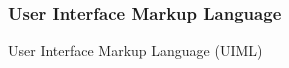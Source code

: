 %
%
%
%
%
%
%

\subsubsection{User Interface Markup Language}
\label{user_interface_markup_language_heading}

User Interface Markup Language (UIML)
